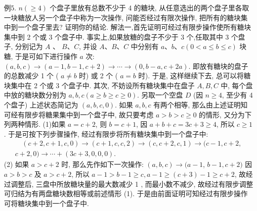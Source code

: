 例5. $n(\geqslant 4)$ 个盘子里放有总数不少于 4 的糖块, 从任意选出的两个盘子里各取一块糖放人另一个盘子中称为一次操作, 问能否经过有限次操作, 把所有的糖块集中到一个盘子里去? 证明你的结论.
解法一,首先证明可经过有限步操作使所有糖块集中到 2 个或 3 个盘子中.
事实上,如果放糖的盘子不少于 3 个,任取其中 3 个盘子, 分别记为 $A$ 、 $B 、 C$, 并设 $A 、 B 、 C$ 中分别有 $a 、 b 、 c(0<a \leqslant b \leqslant c)$ 块糖, 于是可如下进行操作 $a$ 次:
$(a, b, c) \rightarrow(a-1, b-1, c+2) \rightarrow \cdots \rightarrow(0, b-a, c+2 a)$. 即放有糖块的盘子的总数减少 1 个 ( $a \neq b$ 时) 或 2 个 ( $a=b$ 时). 于是, 这样继续下去, 总可以将糖块集中在 2 个或 3 个盘子中.
其次, 不妨设所有糖块集中在盘子 $A, B, C$ 中, 每个盘中放的糖块数分别为 $a, b, c(a \geqslant b \geqslant c \geqslant 0)$. 另取一个空盘 $D$ (因 $n \geqslant 4$, 至少有 4 个盘子) 上述状态简记为 $(a, b, c, 0)$. 如果 $a, b, c$ 有两个相等, 那么由上述证明知可经有限步将糖果集中到一个盘子中, 故只要考虑 $a>b>c \geqslant 0$ 的情形, 又分为下列两种情形.
(1)如果 $a=c+2$, 则 $b=c+1$, 因 $a+b+c=3 c+3 \geqslant 4$, 所以 $c \geqslant 1$. 于是可按下列步骤操作, 经过有限步将所有糖块集中到一个盘子中:
$$
\begin{aligned}
\quad(c+2, c+1, c, 0) \rightarrow(c+1, c, c, 2) \rightarrow(c, c+2, c, 1) \rightarrow(c-1, c+2, \\
c+2,0) \rightarrow \cdots+(3 c+3,0,0,0) .
\end{aligned}
$$
(2) 如果 $a>c+2$ 时, 那么先作如下一次操作: $(a, b, c) \rightarrow(a-1$, $b-1, c+2)$ 因 $a>b>c$ 及 $a>c+2$, 所以 $a-1>b-1 \geqslant c, a-1 \geqslant (c+3)-1 \geqslant c+2$, 故经过调整后, 三盘中所放糖块量的最大数减少 1 , 而最小数不减少, 故经过有限步调整可归结为有两盘糖块数相等或前述情形 (1). 于是由前面证明可知经过有限步操作可将糖块集中到一个盘子中.



